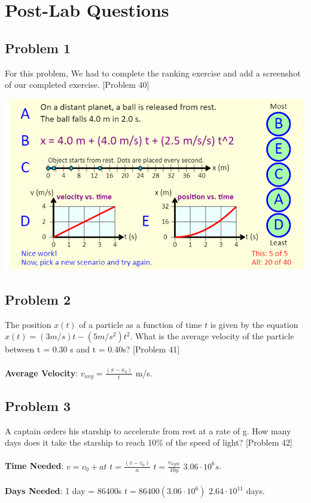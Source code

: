 \documentclass{article}
\begin{document}
\section{Post-Lab Questions}
\subsection{Problem 1}
For this problem, We had to complete the ranking exercise and add a screenshot of our completed exercise. [Problem 40]
\begin{center} 
\includegraphics[scale=0.5]{ranking_acceleration.PNG}
\end{center}
\subsection{Problem 2} 
The position \(x(t)\) of a particle as a function of time \(t\) is given by the equation \(x(t) = (3m/s)t - (5m/s^2)t^2\). What is the average velocity of the particle between t = 0.30 s and t = 0.40s? [Problem 41] \\ \\ 
\textbf{Average Velocity}: \(v_{avg} = \frac{(x-x_0)}{t}\) \Rightarrow {} \si[per-mode=symbol]{\meter\per\second}.
\subsection{Problem 3} 
A captain orders his starship to accelerate from rest at a rate of g. How many days does it take the starship to reach 10\% of the speed of light? [Problem 42] \\ \\ 
\textbf{Time Needed}: \(v = v_0 + at\) \Rightarrow \(t = \frac{(v-v_0)}{a}\) \Rightarrow \(t = \frac{v_{light}}{10g}\) \Rightarrow {}  \Rightarrow \(3.06 \cdot 10^6s\). \\ \\
\textbf{Days Needed}: 1 day = 86400s \Rightarrow \(t = 86400(3.06\cdot10^6)\) \Rightarrow \(2.64\cdot10^{11}\) days. 
\end{document}

